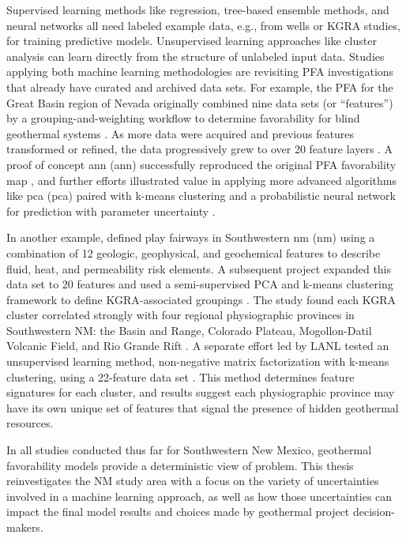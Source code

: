 Supervised learning methods like regression, tree-based ensemble methods, and neural networks all need labeled example data, e.g., from wells or KGRA studies, for training predictive models. Unsupervised learning approaches like cluster analysis can learn directly from the structure of unlabeled input data. Studies applying both machine learning methodologies are revisiting PFA investigations that already have curated and archived data sets. For example, the PFA for the Great Basin region of Nevada originally combined nine data sets (or ``features”) by a grouping-and-weighting workflow to determine favorability for blind geothermal systems \citep{faulds_progress_2017}. As more data were acquired and previous features transformed or refined, the data progressively grew to over 20 feature layers \citep{brown_machine_2020, faulds_discovering_2019}. A proof of concept \acrlong{ann} (\acrshort{ann}) successfully reproduced the original PFA favorability map \citep{brown_machine_2020}, and further efforts illustrated value in applying more advanced algorithms like \acrlong{pca} (\acrshort{pca}) paired with k-means clustering \citep{smith_characterizing_2021} and a probabilistic neural network for prediction with parameter uncertainty \citep{brown_personal_2021}.

In another example, \citet{bielicki_hydrogeolgic_2015} defined play fairways in Southwestern \acrlong{nm} (\acrshort{nm}) using a combination of 12 geologic, geophysical, and geochemical features to describe fluid, heat, and permeability risk elements. A subsequent project expanded this data set to 20 features and used a semi-supervised PCA and k-means clustering framework to define KGRA-associated groupings \citep{pepin_new_2019}. The study found each KGRA cluster correlated strongly with four regional physiographic provinces in Southwestern NM: the Basin and Range, Colorado Plateau, Mogollon-Datil Volcanic Field, and Rio Grande Rift \citep{pepin_new_2019}. A separate effort led by LANL tested an unsupervised learning method, non-negative matrix factorization with k-means clustering, using a 22-feature data set \citep{vesselinov_discovering_2020}. This method determines feature signatures for each cluster, and results suggest each physiographic province may have its own unique set of features that signal the presence of hidden geothermal resources. 

In all studies conducted thus far for Southwestern New Mexico, geothermal favorability models provide a deterministic view of problem. This thesis reinvestigates the NM study area with a focus on the variety of uncertainties involved in a machine learning approach, as well as how those uncertainties can impact the final model results and choices made by geothermal project decision-makers.

